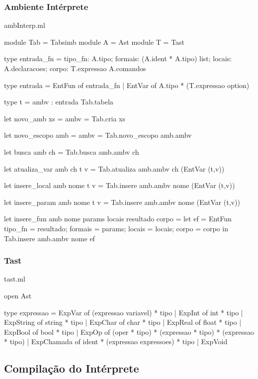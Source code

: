 \documentclass[12pt,a4paper,twoside]{article}
\begin{document}
\subsubsection{Ambiente Intérprete}
ambInterp.ml
\begin{terminal}
module Tab = Tabsimb
module A = Ast
module T = Tast

type entrada_fn = {
  tipo_fn:  A.tipo;
  formais: (A.ident * A.tipo) list;
  locais:  A.declaracoes;
  corpo: T.expressao A.comandos
}

type entrada =  EntFun of entrada_fn
                        |  EntVar of A.tipo * (T.expressao option)

type t = {
  ambv : entrada Tab.tabela
}

let novo_amb xs = { ambv = Tab.cria xs }

let novo_escopo amb = { ambv = Tab.novo_escopo amb.ambv }

let busca amb ch = Tab.busca amb.ambv ch

let atualiza_var amb ch t v =
  Tab.atualiza amb.ambv ch (EntVar (t,v))

let insere_local amb nome t v =
  Tab.insere amb.ambv nome (EntVar (t,v))

let insere_param amb nome t v =
  Tab.insere amb.ambv nome (EntVar (t,v))

let insere_fun amb nome params locais resultado corpo =
  let ef = EntFun { tipo_fn = resultado;
                    formais = params;
                    locais = locais;
                    corpo = corpo }
  in Tab.insere amb.ambv nome ef
\end{terminal}
\subsubsection{Tast}
tast.ml
\begin{terminal}
open Ast

type expressao = ExpVar of (expressao variavel) * tipo
              | ExpInt of int * tipo
              | ExpString of string * tipo
              | ExpChar of char * tipo
              | ExpReal of float * tipo
              | ExpBool of bool * tipo
              | ExpOp of (oper * tipo) * (expressao * tipo) * (expressao * tipo)
              | ExpChamada of ident * (expressao expressoes) * tipo
              | ExpVoid  

\end{terminal}

\subsection{Compilação do Intérprete}
\end{document}
